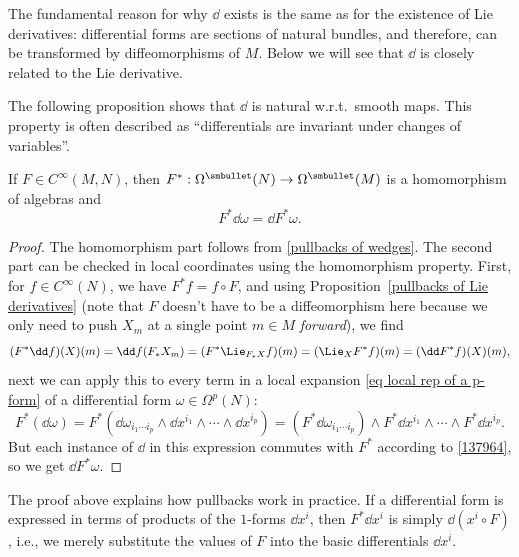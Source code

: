 The fundamental reason for why $\dd$ exists is the same as for the existence of Lie derivatives: differential forms are sections of natural bundles, and therefore, can be transformed by diffeomorphisms of $M$. Below we will see that $\dd$ is closely related to the Lie derivative.

The following proposition shows that $\dd$ is natural w.r.t.\ smooth maps. This property is often described as ``differentials are invariant under changes of variables''.

\begin{prop}
    If $F\in C^\infty(M,N)$, then $F^\ast:\Omega^{\smbullet }(N)\to\Omega^{\smbullet }(M)$ is a homomorphism of algebras and
    \[F^\ast \dd\omega=\dd F^\ast\omega.\]
\end{prop}
\begin{proof}
    The homomorphism part follows from \eqref{pullbacks of wedges}. The second part can be checked in local coordinates using the homomorphism property. First, for $f\in C^\infty(N)$, we have $F^\ast f=f\circ F$, and using Proposition~\ref{pullbacks of Lie derivatives} (note that $F$ doesn't have to be a diffeomorphism here because we only need to push $X_m$ at a single point $m\in M$ \emph{forward}), we find
    \[(F^\ast \dd f)(X)(m)=\dd f(F_\ast X_m)=(F^\ast \Lie_{F_\ast X}f)(m)=(\Lie_X F^\ast f)(m)=(\dd F^\ast f)(X)(m),\label{137964}\]
    next we can apply this to every term in a local expansion \eqref{eq local rep of a p-form} of a differential form $\omega\in\Omega^p(N)$:
    \[F^\ast(\dd\omega)=F^\ast(\dd\omega_{i_1\cdots i_p}\wedge \dd x^{i_1}\wedge\cdots \wedge \dd x^{i_p})=(F^\ast\dd\omega_{i_1\cdots i_p})\wedge F^\ast \dd x^{i_1}\wedge\cdots\wedge F^\ast \dd x^{i_p}.\]
    But each instance of $\dd$ in this expression commutes with $F^\ast$ according to \eqref{137964}, so we get $\dd F^\ast\omega$.
\end{proof}

\begin{rem}
    The proof above explains how pullbacks work in practice. If a differential form is expressed in terms of products of the $1$-forms $\dd x^i$, then $F^\ast\dd x^i$ is simply $\dd (x^i\circ F)$, i.e., we merely substitute the values of $F$ into the basic differentials $\dd x^i$.
\end{rem}

